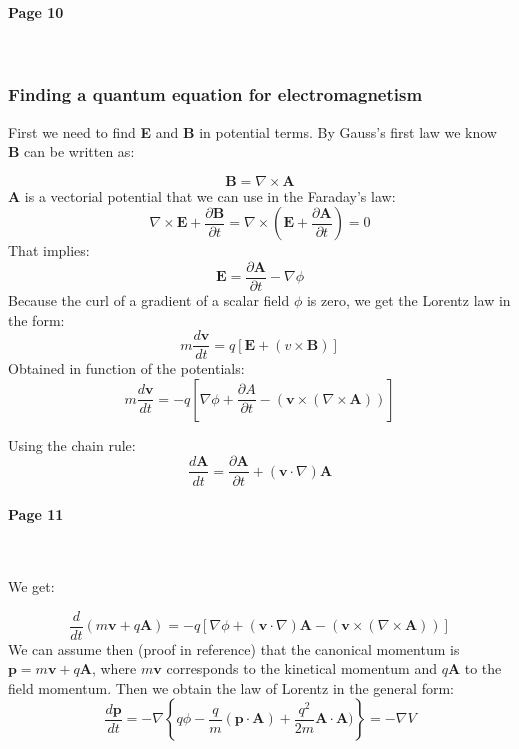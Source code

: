 \documentclass[12pt]{article}
\numberwithin{equation}{subsection}
\newcommand\page[1]{
{
\color{blue}\paragraph{
Page #1
}\mbox{}\\
}
}
\begin{document}
\page{10}
\subsubsection{Finding a quantum equation for electromagnetism}

First we need to find \textbf{E} and \textbf{B} in potential terms. By Gauss's first law we know \textbf{B} can be written as:


\begin{equation}
    \mathbf{B} = \nabla \times \mathbf{A}
\end{equation}
\textbf{A} is a vectorial potential that we can use in the Faraday's law:
\begin{equation}
    \nabla \times \mathbf{E}+\frac{\partial \mathbf B}{\partial t}=\nabla \times (\mathbf{E}+\frac{\partial \mathbf A}{\partial t})=0 
\end{equation}
That implies:
\begin{equation}
   \mathbf E = \frac{\partial\mathbf A}{\partial t} -\nabla \phi
\end{equation}
Because the curl of a gradient of a scalar field $\phi$ is zero, we get the Lorentz law in the form:
\begin{equation}
    m \frac{d\mathbf v}{dt} = q[\mathbf E + (v \times \mathbf B)]
\end{equation}
Obtained in function of the potentials:
\begin{equation}
    m \frac{d\mathbf v}{dt} = -q[\nabla \phi + \frac{\partial A}{\partial t} -(\mathbf v \times (\nabla \times \mathbf A))]
\end{equation}

Using the chain rule:
\begin{equation}
\frac{d\mathbf A}{dt} = \frac{\partial \mathbf A}{\partial t} + (\mathbf v \cdot \nabla) \mathbf A
\end{equation}
 \page{11}
 
 We get:
 
\begin{equation}
    \frac {d}{dt} (m\mathbf{v} +q \mathbf A) =  -q [\nabla \phi + (\mathbf v \cdot \nabla)\mathbf A -(\mathbf v \times (\nabla \times \mathbf A))] 
\end{equation}
We can assume then (proof in reference\cite{gross2016applied}) that the canonical momentum is $\mathbf p = m \mathbf v +q \mathbf A$, where $m\mathbf v$ corresponds to the kinetical momentum and $q\mathbf A$ to the field momentum.
Then we obtain the law of Lorentz in the general form:
\begin{equation}
    \frac{d\mathbf p}{dt} = - \nabla \left\{ q\phi- \frac{q}{m} (\mathbf p \cdot \mathbf A) + \frac{q^2}{2m} \mathbf A \cdot \mathbf A)\right\}= - \nabla V
\end{equation}
\end{document}
